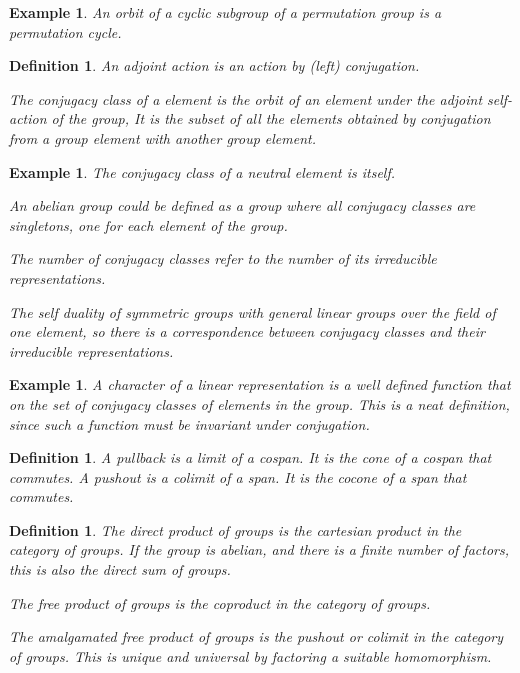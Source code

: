 \documentclass{tufte-book}
\newtheorem{definition}[theorem]{Definition}
\newtheorem{example}[theorem]{Example}
\begin{document}
\begin{example}
  An orbit of a cyclic subgroup of a permutation group is a permutation cycle.
\end{example}

\begin{definition}
  An adjoint action is an action by (left) conjugation.

  The conjugacy class of a element is the orbit of an element under the adjoint self-action of the group, It is the subset of all the elements obtained by conjugation from a group element with another group element.
\end{definition}

\begin{example}
  The conjugacy class of a neutral element is itself.

  An abelian group could be defined as a group where all conjugacy classes are singletons, one for each element of the group.

  The number of conjugacy classes refer to the number of its irreducible representations.

  The self duality of symmetric groups with general linear groups over the field of one element, so there is a correspondence between conjugacy classes and their irreducible representations.
\end{example}

\begin{example}
  A character of a linear representation is a well defined function that on the set of conjugacy classes of elements in the group. This is a neat definition, since such a function must be invariant under conjugation.
\end{example}

\begin{definition}
  A pullback is a limit of a cospan. It is the cone of a cospan that commutes. 
  A pushout is a colimit of a span. It is the cocone of a span that commutes. 
\end{definition}

\begin{definition}
  The direct product of groups is the cartesian product in the category of groups. If the group is abelian, and there is a finite number of factors, this is also the direct sum of groups.

  The free product of groups is the coproduct in the category of groups.

  The amalgamated free product of groups is the pushout or colimit in the category of groups. This is unique and universal by factoring a suitable homomorphism.
\end{definition}
\end{document}
